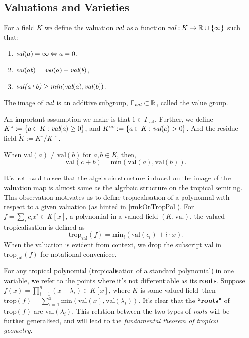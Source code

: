 \subsection{Valuations and Varieties}
    \begin{definition}
        For a field $K$ we define the valuation $\emph{val}$ as a function $\emph{val}: K \to \mathbb{R}\cup \{\infty\}$ such that:
        \begin{enumerate}
            \item $\emph{val}(a) = \infty \Leftrightarrow a = 0$,
            \item $\emph{val}(ab) = \emph{val}(a)+ \emph{val}(b)$,
            \item $\emph{val(a+b)} \geq \emph{min}(\emph{val}(a),\emph{val}(b))$.
        \end{enumerate}
        The image of $\emph{val}$ is an additive subgroup, $\Gamma_{\emph{val}} \subset \mathbb{R}$, called the value group.
        \par An important assumption we make is that $1 \in \Gamma_{\text{val}}$. 
    Further, we define $K^{\circ} := \{a \in K: \emph{val}(a)\geq 0\}$, and $K^{\circ \circ} := \{a \in K: \emph{val}(a)> 0\}$. 
    And the residue field $\tilde{K} := K^{\circ}/K^{\circ \circ}$.
    \end{definition}

    \begin{lemma}
        \label{vallemma}
        When $\text{val}(a) \neq \text{val}(b)$ for $a,b \in K$, then,
        \[
            \text{val}(a+b)= \text{min}(\text{val}(a),\text{val}(b)).
        \]
    \end{lemma}
    It's not hard to see that the algebraic structure induced on the image of the valuation map is almost same as the algrbaic structure on the tropical semiring. 
    This observation motivates us to define tropicalisation of a polynomial with respect to a given valuation (as hinted in \ref{rmkOnTropPol}).
    For $f = \sum_{i}c_{i}x^{i} \in K[x]$, a polynomial in a valued field $(K, \text{val})$, the valued tropicalisation is defined as
    \begin{equation*}
        \text{trop}_{\text{val}}(f) = \text{min}_{i}(\text{val}(c_{i}) + i \cdot x).
    \end{equation*}
    When the valuation is evident from context, we drop the subscript $\text{val}$ in $\text{trop}_{\text{val}}(f)$ for notational conveniece.
    \begin{remark}
        \label{rootValRmk}
For any tropical polynomial (tropicalisation of a standard polynomial) in one variable, we refer to the points where it's not differentiable as its \textbf{roots}. 
    Suppose $f(x) = \prod_{i=1}^{n}(x-\lambda_i) \in K[x]$, where $K$ is some valued field, then $\text{trop}(f) = \sum_{i=1}^{n}\text{min}(\text{val}(x),\text{val}(\lambda_i))$. 
    It's clear that the \textbf{``roots"} of $\text{trop}(f)$ are $\text{val}(\lambda_i)$.
    This relation between the two types of \textit{roots} will be further generalised, and will lead to the \textit{fundamental theorem of tropical geometry}.
    \end{remark}


